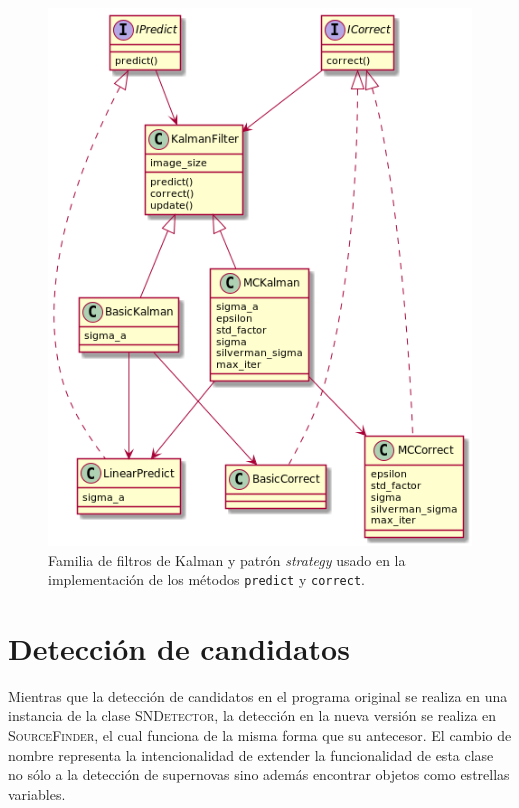 \begin{figure}
\centering
\includegraphics[scale=.5]{images/kalmanfilter_class}
\caption{Familia de filtros de Kalman y patr\'on \textit{strategy} usado en la implementaci\'on de los m\'etodos \texttt{predict} y \texttt{correct}.}
\label{fig:ref1}
\end{figure}

\section{Detecci\'on de candidatos}
\label{sec:detec}
Mientras que la detecci\'on de candidatos en el programa original se realiza en una instancia de la clase \textsc{SNDetector}, la detecci\'on en la nueva versi\'on se realiza en \textsc{SourceFinder}, el cual funciona de la misma forma que su antecesor. El cambio de nombre representa la intencionalidad de extender la funcionalidad de esta clase no s\'olo a la detecci\'on de supernovas sino adem\'as encontrar objetos como estrellas variables.
\bigskip

